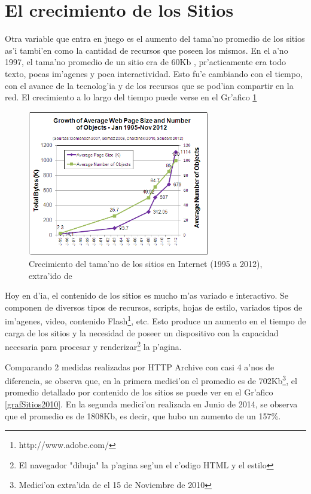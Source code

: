 \section{El crecimiento de los Sitios}

Otra variable que entra en juego es el aumento del tama'no promedio de los sitios as'i tambi'en como la cantidad de recursos que poseen los mismos. En el a'no 1997, el tama'no promedio de un sitio era de 60Kb \citep{atw}, pr'acticamente era todo texto, pocas im'agenes y poca interactividad. Esto fu'e cambiando con el tiempo, con el avance de la tecnolog'ia y de los recursos que se pod'ian compartir en la red. El crecimiento a lo largo del tiempo puede verse en el Gr'afico \ref{grafCrecSitios}

\begin{figure}[ht!]
  	\centering
	\includegraphics[width=300px]{img/grafCrecSitios}
	\caption{\small Crecimiento del tama'no de los sitios en Internet (1995 a 2012), extra'ido de \cite{tamanoSitios}}
	\label{grafCrecSitios}
\end{figure}

Hoy en d'ia, el contenido de los sitios es mucho m'as variado e interactivo. Se componen de diversos tipos de recursos, scripts, hojas de estilo, variados tipos de im'agenes, video, contenido Flash\footnote{http://www.adobe.com/}, etc. Esto produce un aumento en el tiempo de carga de los sitios y la necesidad de poseer un dispositivo con la capacidad necesaria para procesar y renderizar\footnote{El navegador "dibuja" la p'agina seg'un el c'odigo HTML y el estilo} la p'agina.

Comparando 2 medidas realizadas por HTTP Archive\citep{httparchive}  con casi 4 a'nos de diferencia, se observa que, en la primera medici'on el promedio es de 702Kb\footnote{Medici'on extra'ida de \citep{httparchive} el 15 de Noviembre de 2010}, el promedio detallado por contenido de los sitios se puede ver en el Gr'afico \ref{grafSitios2010}. En la segunda medici'on realizada en Junio de 2014, se observa que el promedio es de 1808Kb, es decir, que hubo un aumento de un 157\%.

